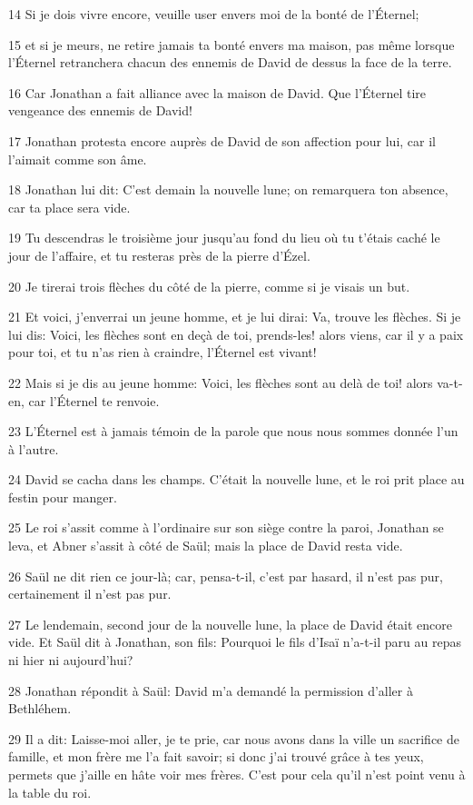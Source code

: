 \par 14 Si je dois vivre encore, veuille user envers moi de la bonté de l'Éternel;
\par 15 et si je meurs, ne retire jamais ta bonté envers ma maison, pas même lorsque l'Éternel retranchera chacun des ennemis de David de dessus la face de la terre.
\par 16 Car Jonathan a fait alliance avec la maison de David. Que l'Éternel tire vengeance des ennemis de David!
\par 17 Jonathan protesta encore auprès de David de son affection pour lui, car il l'aimait comme son âme.
\par 18 Jonathan lui dit: C'est demain la nouvelle lune; on remarquera ton absence, car ta place sera vide.
\par 19 Tu descendras le troisième jour jusqu'au fond du lieu où tu t'étais caché le jour de l'affaire, et tu resteras près de la pierre d'Ézel.
\par 20 Je tirerai trois flèches du côté de la pierre, comme si je visais un but.
\par 21 Et voici, j'enverrai un jeune homme, et je lui dirai: Va, trouve les flèches. Si je lui dis: Voici, les flèches sont en deçà de toi, prends-les! alors viens, car il y a paix pour toi, et tu n'as rien à craindre, l'Éternel est vivant!
\par 22 Mais si je dis au jeune homme: Voici, les flèches sont au delà de toi! alors va-t-en, car l'Éternel te renvoie.
\par 23 L'Éternel est à jamais témoin de la parole que nous nous sommes donnée l'un à l'autre.
\par 24 David se cacha dans les champs. C'était la nouvelle lune, et le roi prit place au festin pour manger.
\par 25 Le roi s'assit comme à l'ordinaire sur son siège contre la paroi, Jonathan se leva, et Abner s'assit à côté de Saül; mais la place de David resta vide.
\par 26 Saül ne dit rien ce jour-là; car, pensa-t-il, c'est par hasard, il n'est pas pur, certainement il n'est pas pur.
\par 27 Le lendemain, second jour de la nouvelle lune, la place de David était encore vide. Et Saül dit à Jonathan, son fils: Pourquoi le fils d'Isaï n'a-t-il paru au repas ni hier ni aujourd'hui?
\par 28 Jonathan répondit à Saül: David m'a demandé la permission d'aller à Bethléhem.
\par 29 Il a dit: Laisse-moi aller, je te prie, car nous avons dans la ville un sacrifice de famille, et mon frère me l'a fait savoir; si donc j'ai trouvé grâce à tes yeux, permets que j'aille en hâte voir mes frères. C'est pour cela qu'il n'est point venu à la table du roi.
